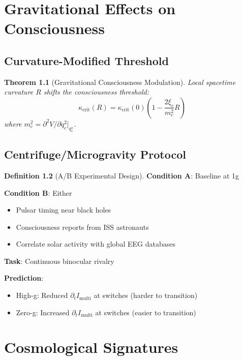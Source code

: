 \documentclass[openany]{memoir}
\theoremstyle{definition}
\newtheorem{definition}{Definition}[chapter]
\theoremstyle{plain}
\newtheorem{theorem}[definition]{Theorem}
\theoremstyle{remark}
\newcommand{\Imulti}{I_{\text{multi}}}
\begin{document}
\chapter{Gravitational Effects on Consciousness}

\section{Curvature-Modified Threshold}

\begin{theorem}[Gravitational Consciousness Modulation]
Local spacetime curvature $R$ shifts the consciousness threshold:
\begin{equation}
\kappa_{\text{crit}}(R) = \kappa_{\text{crit}}(0)\left(1 - \frac{2\xi_c}{m_c^2}R\right)
\end{equation}
where $m_c^2 = \partial^2 V/\partial q_c^2|_{q_c^\star}$.
\end{theorem}

\section{Centrifuge/Microgravity Protocol}

\begin{definition}[A/B Experimental Design]
\textbf{Condition A}: Baseline at 1g

\textbf{Condition B}: Either
\begin{itemize}
\item Pulsar timing near black holes
\item Consciousness reports from ISS astronauts
\item Correlate solar activity with global EEG databases
\end{itemize}

\textbf{Task}: Continuous binocular rivalry

\textbf{Prediction}: 
\begin{itemize}
\item High-g: Reduced $\partial_t \Imulti$ at switches (harder to transition)
\item Zero-g: Increased $\partial_t \Imulti$ at switches (easier to transition)
\end{itemize}
\end{definition}

\chapter{Cosmological Signatures}
\end{document}
